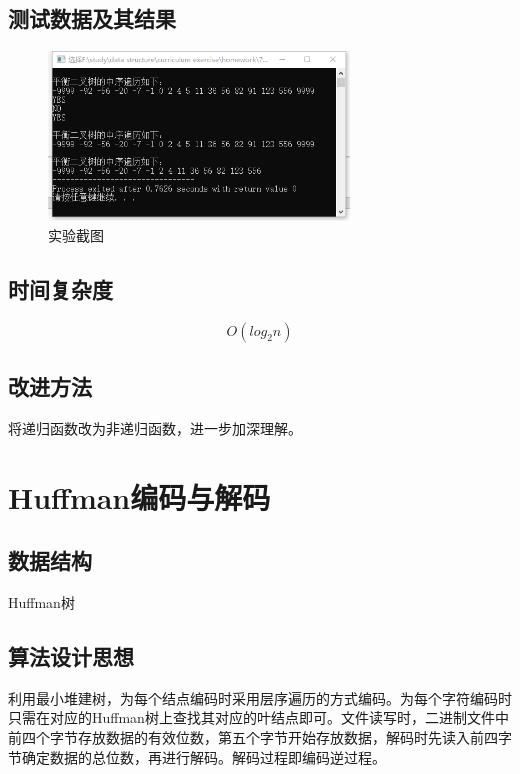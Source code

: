 \documentclass[a4paper,11pt,UTF8]{ctexart}
\begin{document}
\subsection{测试数据及其结果}
\begin{figure}[htbp] %
    \centering
    \includegraphics[width=8cm]{5.png}
    \caption{实验截图}
\end{figure}
\subsection{时间复杂度}
$$O(log_{2}n)$$
\subsection{改进方法}
将递归函数改为非递归函数，进一步加深理解。


\section{Huffman编码与解码}
\subsection{数据结构}
Huffman树
\subsection{算法设计思想}
利用最小堆建树，为每个结点编码时采用层序遍历的方式编码。为每个字符编码时只需在对应的Huffman树上查找其对应的叶结点即可。文件读写时，二进制文件中前四个字节存放数据的有效位数，第五个字节开始存放数据，解码时先读入前四字节确定数据的总位数，再进行解码。解码过程即编码逆过程。
\end{document}
